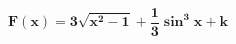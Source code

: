 \documentclass[12pt,a4paper]{article}
\begin{document}
\begin{enumerate}
\begin{enumerate}
\begin{resultbox}
    \[
    \mathbf{F(x) = 3\sqrt{x^2 - 1} +\dfrac{1}{3} \sin^{3} x +k }
    \]
\end{resultbox}         
        
    \end{enumerate}

\end{enumerate}
\end{document}
